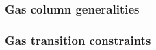 \subsubsection{Gas column generalities}         \label{hub: generalities: gas: generalities}                    
\subsubsection{Gas transition constraints}      \label{hub: generalities: gas: gas transition constraints}      
